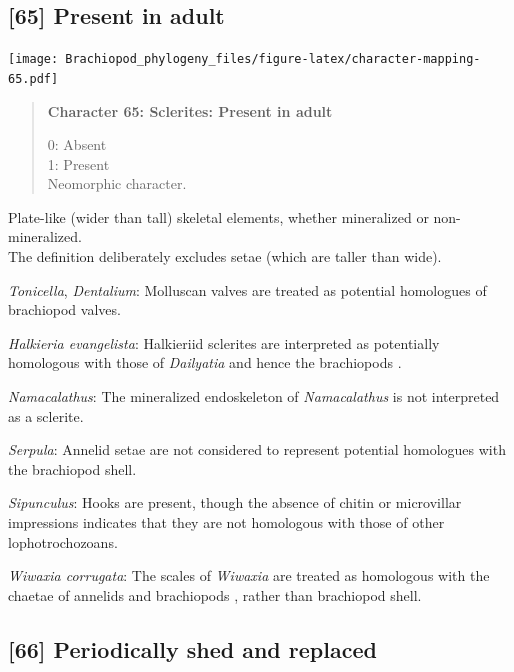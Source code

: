 \documentclass[openany]{book}
\begin{document}
\subsection*{{[}65{]} Present in adult}\label{present-in-adult}

\texttt{[image: Brachiopod\_phylogeny\_files/figure-latex/character-mapping-65.pdf]}

\begin{quote}
\textbf{Character 65: Sclerites: Present in adult}

0: Absent\\
1: Present\\
Neomorphic character.
\end{quote}

Plate-like (wider than tall) skeletal elements, whether mineralized or
non-mineralized.\\
The definition deliberately excludes setae (which are taller than wide).

\hypertarget{Dentalium-coding-65}{}
\emph{Tonicella}, \emph{Dentalium}: Molluscan valves are treated as
potential homologues of brachiopod valves.

\hypertarget{Halkieria_evangelista-coding-65}{}
\emph{Halkieria evangelista}: Halkieriid sclerites are interpreted as
potentially homologous with those of \emph{Dailyatia} and hence the
brachiopods \citep{Zhao2017}.

\hypertarget{Namacalathus-coding-65}{}
\emph{Namacalathus}: The mineralized endoskeleton of \emph{Namacalathus}
is not interpreted as a sclerite.

\hypertarget{Serpula-coding-65}{}
\emph{Serpula}: Annelid setae are not considered to represent potential
homologues with the brachiopod shell.

\hypertarget{Sipunculus-coding-65}{}
\emph{Sipunculus}: Hooks are present, though the absence of chitin or
microvillar impressions indicates that they are not homologous with
those of other lophotrochozoans.

\hypertarget{Wiwaxia_corrugata-coding-65}{}
\emph{Wiwaxia corrugata}: The scales of \emph{Wiwaxia} are treated as
homologous with the chaetae of annelids and brachiopods
\citep{Butterfield1990, Smith2014, Zhang2015}, rather than brachiopod
shell.

\subsection*{{[}66{]} Periodically shed and
replaced}\label{periodically-shed-and-replaced}
\end{document}
